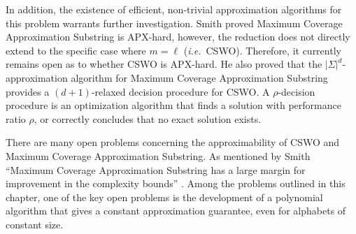 In addition, the existence of efficient, non-trivial approximation algorithms for this problem warrants further investigation. Smith \cite{asmith} proved {\sc Maximum Coverage Approximation Substring} is APX-hard, however, the reduction does not directly extend to the specific case where $m = \ell$ ({\em i.e.}\ {\sc CSWO}).  Therefore, it currently remains open as to whether {\sc CSWO} is APX-hard.  He also proved that the $|\Sigma|^d$-approximation algorithm for {\sc Maximum Coverage Approximation Substring} provides a $(d + 1)$-relaxed decision procedure for {\sc CSWO}.  A $\rho$-decision procedure is an optimization algorithm that finds a solution with performance ratio $\rho$, or correctly concludes that no exact solution exists.  

There are many open problems concerning the approximability of  {\sc CSWO} and {\sc Maximum Coverage Approximation Substring}. As mentioned by Smith ``{\sc Maximum Coverage Approximation Substring} has a large margin for improvement in the complexity bounds'' \cite[page 80]{asmith}.  Among the problems outlined in this chapter, one of the key open problems is the development of a polynomial algorithm that gives a constant approximation guarantee, even for alphabets of constant size.  